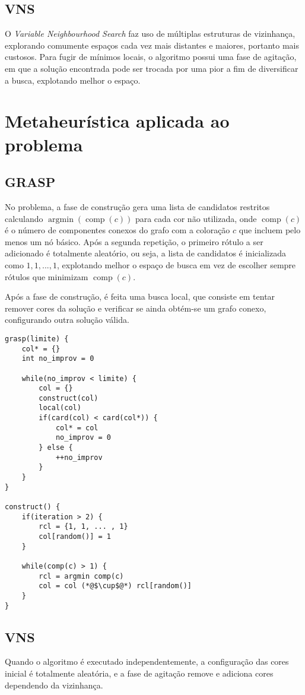 \documentclass[12pt, a4paper]{article}
\DeclareMathOperator{\argmin}{argmin}
\DeclareMathOperator{\comp}{comp}
\begin{document}
\subsection{VNS}
O \emph{Variable Neighbourhood Search} faz uso de múltiplas estruturas de
vizinhança, explorando comumente espaços cada vez mais distantes e maiores,
portanto mais custosos. Para fugir de mínimos locais, o algoritmo possui uma fase
de agitação, em que a solução encontrada pode ser trocada por uma pior a fim de
diversificar a busca, explotando melhor o espaço.


\section{Metaheurística aplicada ao problema}
\subsection{GRASP}
No problema, a fase de construção gera uma lista de candidatos restritos
calculando $ \argmin(\comp(c)) $ para cada cor não utilizada, onde $ \comp(c) $
é o número de componentes conexos do grafo com a coloração $ c $ que incluem
pelo menos um nó básico. Após a segunda repetição, o primeiro rótulo a ser
adicionado é totalmente aleatório, ou seja, a lista de candidatos é
inicializada como $ {1, 1, ..., 1 } $, explotando melhor o espaço de busca em
vez de escolher sempre rótulos que minimizam $ \comp(c) $.

Após a fase de construção, é feita uma busca local, que consiste em tentar
remover cores da solução e verificar se ainda obtém-se um grafo conexo,
configurando outra solução válida.

\begin{lstlisting}[caption=Pseudocódigo para GRASP, basicstyle=\ttfamily\scriptsize]
grasp(limite) {
    col* = {}
    int no_improv = 0

    while(no_improv < limite) {
        col = {}
        construct(col)
        local(col)
        if(card(col) < card(col*)) {
            col* = col
            no_improv = 0
        } else {
            ++no_improv
        }
    }
}

construct() {
    if(iteration > 2) {
        rcl = {1, 1, ... , 1}
        col[random()] = 1
    }

    while(comp(c) > 1) {
        rcl = argmin comp(c)
        col = col (*@$\cup$@*) rcl[random()]
    }
}
\end{lstlisting}

\subsection{VNS}
Quando o algoritmo é executado independentemente, a configuração das cores
inicial é totalmente aleatória, e a fase de agitação remove e adiciona cores
dependendo da vizinhança.
\end{document}
